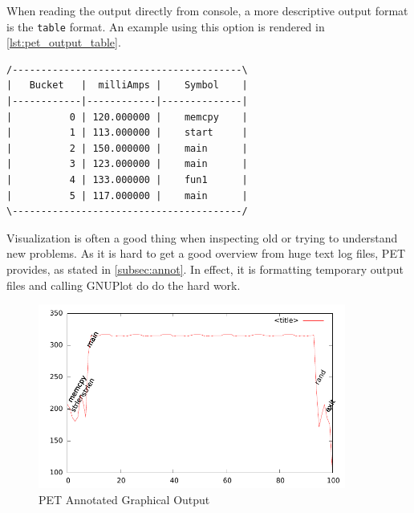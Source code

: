When reading the output directly from console, a more descriptive output format
is the \texttt{table} format. An example using this option is rendered in
\autoref{lst:pet_output_table}.

\begin{lstlisting}[float=hbt,label={lst:pet_output_table},caption={PET Table Output}]
/----------------------------------------\
|   Bucket   |  milliAmps |    Symbol    |
|------------|------------|--------------|
|          0 | 120.000000 |    memcpy    |
|          1 | 113.000000 |    start     |
|          2 | 150.000000 |    main      |
|          3 | 123.000000 |    main      |
|          4 | 133.000000 |    fun1      |
|          5 | 117.000000 |    main      |
\----------------------------------------/
\end{lstlisting}

Visualization is often a good thing when inspecting old or trying to understand
new problems. As it is hard to get a good overview from huge text log files, PET
provides, as stated in \autoref{subsec:annot}. In effect, it is formatting
temporary output files and calling GNUPlot do do the hard work.

\begin{figure}
    \includegraphics[width=0.9\textwidth]{figs/annot.pdf}
    \caption{PET Annotated Graphical Output}
    \label{fig:annot}
\end{figure}

